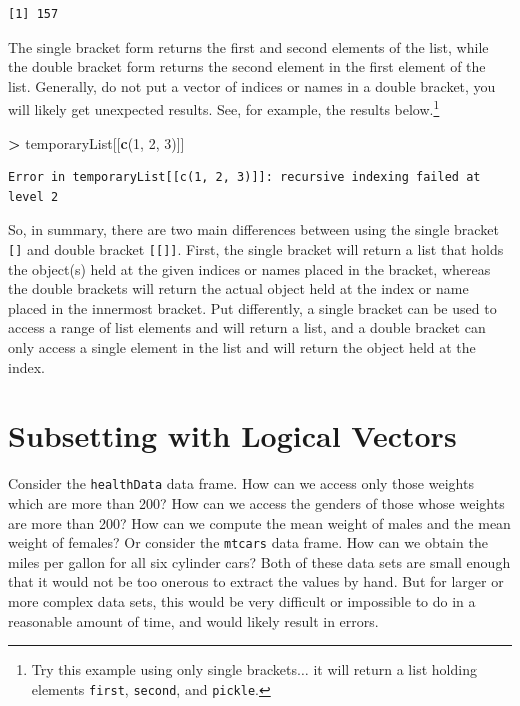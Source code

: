 \documentclass[]{krantz}
\makeatletter
\newenvironment{Shaded}{\begin{snugshade}}{\end{snugshade}}
\newcommand{\DecValTok}[1]{\textcolor[rgb]{0.06,0.06,0.06}{#1}}
\newcommand{\KeywordTok}[1]{\textcolor[rgb]{0.27,0.27,0.27}{\textbf{#1}}}
\newcommand{\NormalTok}[1]{#1}
\newcommand{\OperatorTok}[1]{\textcolor[rgb]{0.43,0.43,0.43}{\textbf{#1}}}
\newcommand{\StringTok}[1]{\textcolor[rgb]{0.5,0.5,0.5}{#1}}
\newenvironment{kframe}{%
\medskip{}
\setlength{\fboxsep}{.8em}
 \def\at@end@of@kframe{}%
 \ifinner\ifhmode%
  \def\at@end@of@kframe{\end{minipage}}%
  \begin{minipage}{\columnwidth}%
 \fi\fi%
 \def\FrameCommand##1{\hskip\@totalleftmargin \hskip-\fboxsep
 \colorbox{shadecolor}{##1}\hskip-\fboxsep
     \hskip-\linewidth \hskip-\@totalleftmargin \hskip\columnwidth}%
 \MakeFramed {\advance\hsize-\width
   \@totalleftmargin\z@ \linewidth\hsize
   \@setminipage}}%
 {\par\unskip\endMakeFramed%
 \at@end@of@kframe}
\renewenvironment{Shaded}{\begin{kframe}}{\end{kframe}}
\makeatother
\begin{document}
\begin{verbatim}
[1] 157
\end{verbatim}

The single bracket form returns the first and second elements of the list, while the double bracket form returns the second element in the first element of the list. Generally, do not put a vector of indices or names in a double bracket, you will likely get unexpected results. See, for example, the results below.\footnote{Try this example using only single brackets\(\ldots\) it will return a list holding elements \texttt{first}, \texttt{second}, and \texttt{pickle}.}

\begin{Shaded}
\begin{Highlighting}[]
\OperatorTok{>}\StringTok{ }\NormalTok{temporaryList[[}\KeywordTok{c}\NormalTok{(}\DecValTok{1}\NormalTok{, }\DecValTok{2}\NormalTok{, }\DecValTok{3}\NormalTok{)]]}
\end{Highlighting}
\end{Shaded}

\begin{verbatim}
Error in temporaryList[[c(1, 2, 3)]]: recursive indexing failed at level 2
\end{verbatim}

So, in summary, there are two main differences between using the single bracket \texttt{{[}{]}} and double bracket \texttt{{[}{[}{]}{]}}. First, the single bracket will return a list that holds the object(s) held at the given indices or names placed in the bracket, whereas the double brackets will return the actual object held at the index or name placed in the innermost bracket. Put differently, a single bracket can be used to access a range of list elements and will return a list, and a double bracket can only access a single element in the list and will return the object held at the index.

\hypertarget{subsetting}{%
\section{Subsetting with Logical Vectors}\label{subsetting}}

Consider the \texttt{healthData} data frame. How can we access only those weights which are more than 200? How can we access the genders of those whose weights are more than 200? How can we compute the mean weight of males and the mean weight of females? Or consider the \texttt{mtcars} data frame. How can we obtain the miles per gallon for all six cylinder cars? Both of these data sets are small enough that it would not be too onerous to extract the values by hand. But for larger or more complex data sets, this would be very difficult or impossible to do in a reasonable amount of time, and would likely result in errors.
\end{document}
